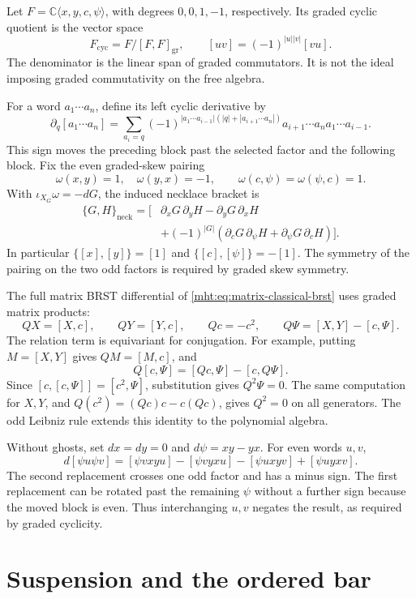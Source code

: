 Let $F=\mathbb C\langle x,y,c,\psi\rangle$, with degrees
$0,0,1,-1$, respectively. Its graded cyclic quotient is the vector
space
\[
 F_{\mathrm{cyc}}=F/[F,F]_{\mathrm{gr}},\qquad
 [uv]=(-1)^{|u||v|}[vu].
\]
The denominator is the linear span of graded commutators. It is not
the ideal imposing graded commutativity on the free algebra.

For a word $a_1\cdots a_n$, define its left cyclic derivative by
\[
 \partial_q[a_1\cdots a_n]
 =\sum_{a_i=q}
 (-1)^{|a_1\cdots a_{i-1}|(|q|+|a_{i+1}\cdots a_n|)}
 a_{i+1}\cdots a_na_1\cdots a_{i-1}.
\]
This sign moves the preceding block past the selected factor and
the following block. Fix the even graded-skew pairing
\[
 \omega(x,y)=1,\quad\omega(y,x)=-1,
 \qquad \omega(c,\psi)=\omega(\psi,c)=1.
\]
With $\iota_{X_G}\omega=-dG$, the induced necklace bracket is
\[
 \begin{split}
 \{G,H\}_{\mathrm{neck}}=
 \bigl[&\partial_xG\,\partial_yH-\partial_yG\,\partial_xH\\
 &+(-1)^{|G|}(\partial_cG\,\partial_\psi H
                         +\partial_\psi G\,\partial_cH)\bigr].
 \end{split}
\]
In particular $\{[x],[y]\}=[1]$ and
$\{[c],[\psi]\}=-[1]$. The symmetry of the pairing on the two
odd factors is required by graded skew symmetry.

The full matrix BRST differential of
\eqref{mht:eq:matrix-classical-brst} uses graded matrix products:
\[
 QX=[X,c],\qquad QY=[Y,c],\qquad Qc=-c^2,
 \qquad Q\Psi=[X,Y]-[c,\Psi].
\]
The relation term is equivariant for conjugation. For example,
putting $M=[X,Y]$ gives $QM=[M,c]$, and
\[
 Q[c,\Psi]=[Qc,\Psi]-[c,Q\Psi].
\]
Since $[c,[c,\Psi]]=[c^2,\Psi]$, substitution gives $Q^2\Psi=0$.
The same computation for $X,Y$, and $Q(c^2)=(Qc)c-c(Qc)$,
gives $Q^2=0$ on all generators. The odd Leibniz rule extends this
identity to the polynomial algebra.

Without ghosts, set $dx=dy=0$ and $d\psi=xy-yx$. For even words
$u,v$,
\begin{equation}\label{mht:eq:sign-two-psi}
 d[\psi u\psi v]
   =[\psi vxyu]-[\psi vyxu]-[\psi uxyv]+[\psi uyxv].
\end{equation}
The second replacement crosses one odd factor and has a minus
sign. The first replacement can be rotated past the remaining
$\psi$ without a further sign because the moved block is even.
Thus interchanging $u,v$ negates the result, as required by graded
cyclicity.

\section{Suspension and the ordered bar}

